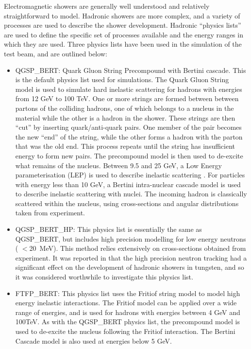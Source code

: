 Electromagnetic showers are generally well understood and relatively straightforward to model. Hadronic showers are more complex, and a variety of processes are used to describe the shower development. Hadronic ``physics lists'' are used to define the specific set of processes available and the energy ranges in which they are used. Three physics lists have been used in the simulation of the test beam, and are outlined below:

\begin{itemize}
\item{QGSP\_BERT:} Quark Gluon String Precompound with Bertini cascade. This is the default physics list used for \atlas simulations. The Quark Gluon String model \cite{QGSP_paper} is used to simulate hard inelastic scattering for hadrons with energies from 12 GeV to 100 TeV. One or more strings are formed between between partons of the colliding hadrons, one of which belongs to a nucleus in the material while the other is a hadron in the shower. These strings are then ``cut'' by inserting quark/anti-quark pairs. One member of the pair becomes the new ``end'' of the string, while the other forms a hadron with the parton that was the old end. This process repeats until the string has insufficient energy to form new pairs. The precompound model is then used to de-excite what remains of the nucleus.
Between 9.5 and 25 GeV, a Low Energy parameterisation (LEP) is used to describe inelastic scattering \cite{LEP_paper}. 
For particles with energy less than 10 GeV, a Bertini intra-nuclear cascade model \cite{ Bertini_paper, Bertini2} is used to describe inelastic scattering with nuclei. The incoming hadron is classically scattered within the nucleus, using cross-sections and angular distributions taken from experiment. 
\item{QGSP\_BERT\_HP:} This physics list is essentially the same as QGSP\_BERT, but includes high precision modelling for low energy neutrons ( $<$20~MeV). This method relies extensively on cross-sections obtained from experiment. It was reported in \cite{QGSP_HP_note} that the high precision neutron tracking had a significant effect on the development of hadronic showers in tungsten, and so it was considered worthwhile to investigate this physics list.
\item{FTFP\_BERT:} This physics list uses the Fritiof string model \cite{Fritiof_string_paper} to model high energy inelastic interactions. The Fritiof model can be applied over a wide range of energies, and is used for hadrons with energies between 4 GeV and 100TeV. As with the QGSP\_BERT physics list, the precompound model is used to de-excite the nucleus following the Fritiof interaction. The Bertini Cascade model is also used at energies below 5 GeV.
\end{itemize}





